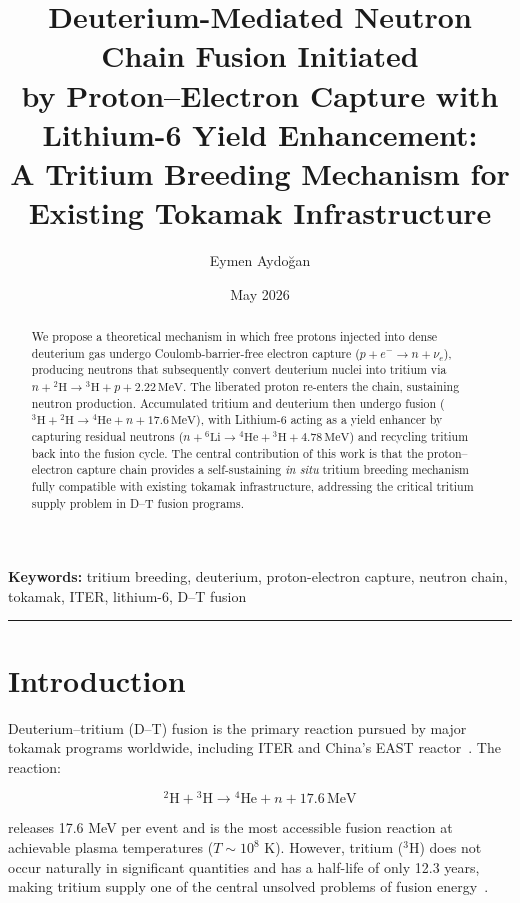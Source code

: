 \documentclass[12pt,a4paper]{article}
\title{\textbf{Deuterium-Mediated Neutron Chain Fusion Initiated\\
by Proton--Electron Capture with Lithium-6 Yield Enhancement:\\
A Tritium Breeding Mechanism for Existing Tokamak Infrastructure}}
\author{Eymen Aydoğan}
\date{May 2026}
\begin{document}
\maketitle

\begin{abstract}
We propose a theoretical mechanism in which free protons injected into
dense deuterium gas undergo Coulomb-barrier-free electron capture
($p + e^- \rightarrow n + \nu_e$), producing neutrons that
subsequently convert deuterium nuclei into tritium via
$n + {}^2\text{H} \rightarrow {}^3\text{H} + p + 2.22\,\text{MeV}$.
The liberated proton re-enters the chain, sustaining neutron
production. Accumulated tritium and deuterium then undergo
fusion (${}^3\text{H} + {}^2\text{H} \rightarrow {}^4\text{He}
+ n + 17.6\,\text{MeV}$), with Lithium-6 acting as a yield
enhancer by capturing residual neutrons
($n + {}^6\text{Li} \rightarrow {}^4\text{He} + {}^3\text{H}
+ 4.78\,\text{MeV}$) and recycling tritium back into the fusion
cycle. The central contribution of this work is that the
proton--electron capture chain provides a self-sustaining
\emph{in situ} tritium breeding mechanism fully compatible with
existing tokamak infrastructure, addressing the critical tritium
supply problem in D--T fusion programs.
\end{abstract}

\noindent\textbf{Keywords:} tritium breeding, deuterium, proton-electron
capture, neutron chain, tokamak, ITER, lithium-6, D--T fusion

\hrule
\vspace{1em}

\section{Introduction}

Deuterium--tritium (D--T) fusion is the primary reaction pursued by
major tokamak programs worldwide, including ITER and China's EAST
reactor~\cite{iter2023,east2023}. The reaction:

\begin{equation}
  {}^2\text{H} + {}^3\text{H} \rightarrow {}^4\text{He} + n
  + 17.6\,\text{MeV}
  \label{eq:dtfusion}
\end{equation}

releases 17.6 MeV per event and is the most accessible fusion
reaction at achievable plasma temperatures ($T \sim 10^8$ K).
However, tritium (${}^3\text{H}$) does not occur naturally in
significant quantities and has a half-life of only 12.3 years,
making tritium supply one of the central unsolved problems of
fusion energy~\cite{abdou2021}.
\end{document}

